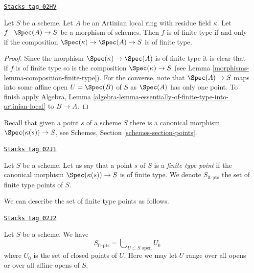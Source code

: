 \begin{lemma}
\label{morphisms-lemma-artinian-finite-type}
\href{https://stacks.math.columbia.edu/tag/02HV}{\texttt{Stacks tag 02HV}}

Let $S$ be a scheme.
Let $A$ be an Artinian local ring with residue field $\kappa$.
Let $f : \Spec(A) \to S$ be a morphism of schemes.
Then $f$ is of finite type if and only if the composition
$\Spec(\kappa) \to \Spec(A) \to S$ is of finite type.
\end{lemma}

\begin{proof}

Since the morphism $\Spec(\kappa) \to \Spec(A)$ is of finite
type it is clear that if $f$ is of finite type so is the composition
$\Spec(\kappa) \to S$ (see Lemma \ref{morphisms-lemma-composition-finite-type}).
For the converse, note that $\Spec(A) \to S$ maps into some affine open
$U = \Spec(B)$ of $S$ as $\Spec(A)$ has only one point. To finish
apply Algebra, Lemma
\ref{algebra-lemma-essentially-of-finite-type-into-artinian-local}
to $B \to A$.
\end{proof}

Recall that given a point $s$ of a scheme $S$ there is a canonical
morphism $\Spec(\kappa(s)) \to S$, see
Schemes, Section \ref{schemes-section-points}.

\begin{definition}
\label{morphisms-definition-finite-type-point}
\href{https://stacks.math.columbia.edu/tag/02J1}{\texttt{Stacks tag 02J1}}

Let $S$ be a scheme.
Let us say that a point $s$ of $S$ is a {\it finite type point}
if the canonical morphism $\Spec(\kappa(s)) \to S$ is of finite type.
We denote $S_{\text{ft-pts}}$ the set of finite type points of $S$.
\end{definition}

We can describe the set of finite type points as follows.

\begin{lemma}
\label{morphisms-lemma-identify-finite-type-points}
\href{https://stacks.math.columbia.edu/tag/02J2}{\texttt{Stacks tag 02J2}}

Let $S$ be a scheme. We have
$$
S_{\text{ft-pts}} = \bigcup\nolimits_{U \subset S\text{ open}} U_0
$$
where $U_0$ is the set of closed points of $U$.
Here we may let $U$ range over all opens or over all affine opens of $S$.
\end{lemma}

